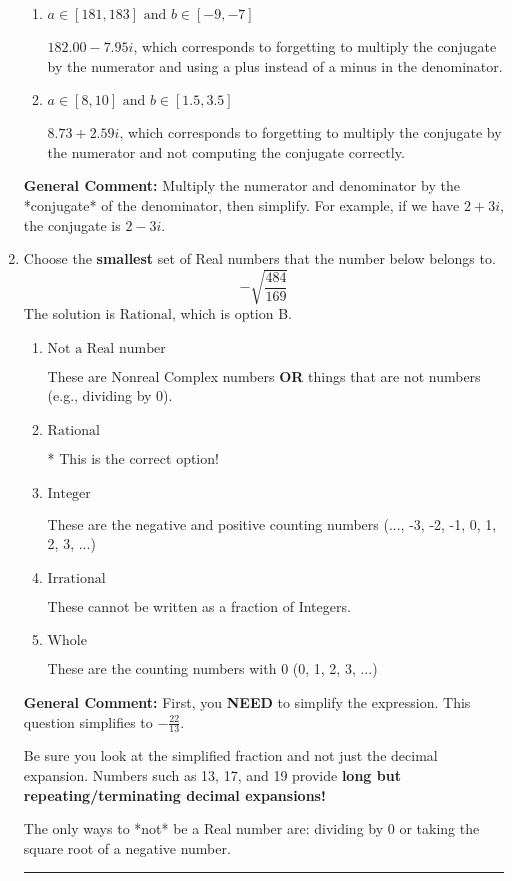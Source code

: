 \documentclass{extbook}[14pt]
\newcommand{\litem}[1]{\item #1

\rule{\textwidth}{0.4pt}}
\begin{document}
\begin{enumerate}
{\begin{enumerate}[label=\Alph*.]
 $4.44  - 326.00 i$, which corresponds to forgetting to multiply the conjugate by the numerator.
\item \( a \in [181, 183] \text{ and } b \in [-9, -7] \)

 $182.00  - 7.95 i$, which corresponds to forgetting to multiply the conjugate by the numerator and using a plus instead of a minus in the denominator.
\item \( a \in [8, 10] \text{ and } b \in [1.5, 3.5] \)

 $8.73  + 2.59 i$, which corresponds to forgetting to multiply the conjugate by the numerator and not computing the conjugate correctly.
\end{enumerate}

\textbf{General Comment:} Multiply the numerator and denominator by the *conjugate* of the denominator, then simplify. For example, if we have $2+3i$, the conjugate is $2-3i$.
}
\litem{
Choose the \textbf{smallest} set of Real numbers that the number below belongs to.
\[ -\sqrt{\frac{484}{169}} \]The solution is \( \text{Rational} \), which is option B.\begin{enumerate}[label=\Alph*.]
\item \( \text{Not a Real number} \)

These are Nonreal Complex numbers \textbf{OR} things that are not numbers (e.g., dividing by 0).
\item \( \text{Rational} \)

* This is the correct option!
\item \( \text{Integer} \)

These are the negative and positive counting numbers (..., -3, -2, -1, 0, 1, 2, 3, ...)
\item \( \text{Irrational} \)

These cannot be written as a fraction of Integers.
\item \( \text{Whole} \)

These are the counting numbers with 0 (0, 1, 2, 3, ...)
\end{enumerate}

\textbf{General Comment:} First, you \textbf{NEED} to simplify the expression. This question simplifies to $-\frac{22}{13}$. 
 
 Be sure you look at the simplified fraction and not just the decimal expansion. Numbers such as 13, 17, and 19 provide \textbf{long but repeating/terminating decimal expansions!} 
 
 The only ways to *not* be a Real number are: dividing by 0 or taking the square root of a negative number. 
 
}
\end{enumerate}
\end{document}
